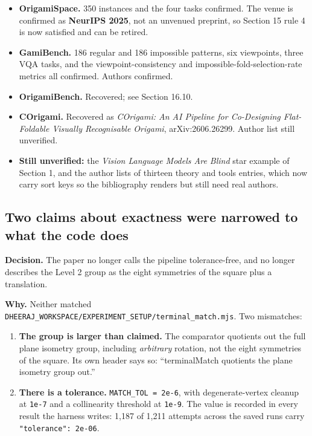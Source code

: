 \begin{itemize}
\item \textbf{OrigamiSpace.} 350 instances and the four tasks confirmed. The venue is confirmed as
  \textbf{NeurIPS 2025}, not an unvenued preprint, so Section 15 rule 4 is now satisfied and can be
  retired.
\item \textbf{GamiBench.} 186 regular and 186 impossible patterns, six viewpoints, three VQA tasks,
  and the viewpoint-consistency and impossible-fold-selection-rate metrics all confirmed. Authors
  confirmed.
\item \textbf{OrigamiBench.} Recovered; see Section 16.10.
\item \textbf{COrigami.} Recovered as \emph{COrigami: An AI Pipeline for Co-Designing Flat-Foldable
  Visually Recognisable Origami}, arXiv:2606.26299. Author list still unverified.
\item \textbf{Still unverified:} the \emph{Vision Language Models Are Blind} star example of
  Section 1, and the author lists of thirteen theory and tools entries, which now carry sort keys so
  the bibliography renders but still need real authors.
\end{itemize}

\subsection{Two claims about exactness were narrowed to what the code does}

\textbf{Decision.} The paper no longer calls the pipeline tolerance-free, and no longer describes
the Level 2 group as the eight symmetries of the square plus a translation.

\textbf{Why.} Neither matched\\
\texttt{DHEERAJ\_WORKSPACE/EXPERIMENT\_SETUP/terminal\_match.mjs}.
Two mismatches:

\begin{enumerate}
\item \textbf{The group is larger than claimed.} The comparator quotients out the full plane
  isometry group, including \emph{arbitrary} rotation, not the eight symmetries of the square. Its
  own header says so: ``terminalMatch quotients the plane isometry group out.''
\item \textbf{There is a tolerance.} \texttt{MATCH\_TOL = 2e-6}, with degenerate-vertex cleanup at
  \texttt{1e-7} and a collinearity threshold at \texttt{1e-9}. The value is recorded in every result
  the harness writes: 1,187 of 1,211 attempts across the saved runs carry
  \texttt{"tolerance": 2e-06}.
\end{enumerate}

